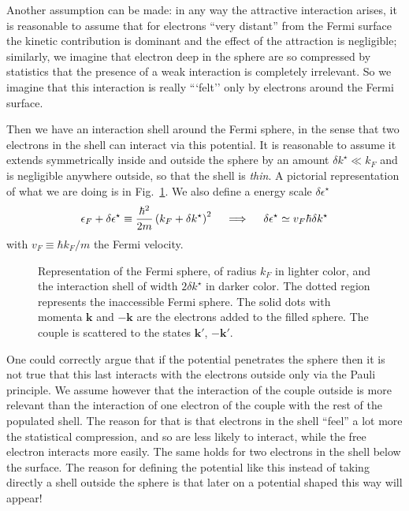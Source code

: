 Another assumption can be made: in any way the attractive interaction arises, it is reasonable to assume that for electrons ``very distant'' from the Fermi surface the kinetic contribution is dominant and the effect of the attraction is negligible; similarly, we imagine that electron deep in the sphere are so compressed by statistics that the presence of a weak interaction is completely irrelevant. So we imagine that this interaction is really ```felt'' only by electrons around the Fermi surface.

Then we have an interaction shell around the Fermi sphere, in the sense that two electrons in the shell can interact via this potential. It is reasonable to assume it extends symmetrically inside and outside the sphere by an amount $\delta k^\star \ll k_F$ and is negligible anywhere outside, so that the shell is \textit{thin}. A pictorial representation of what we are doing is in Fig.~\ref{fig:fermi sphere and shell}. We also define a energy scale $\delta\epsilon^\star$
\[
	\epsilon_F + \delta\epsilon^\star \equiv \frac{\hbar^2}{2m} \left({k_F + \delta k^\star}\right)^2
	\quad\implies\quad
	\delta\epsilon^\star \simeq v_F \hbar \delta k^\star
\]
with $v_F \equiv \hbar k_F/m$ the Fermi velocity.

\begin{figure}
	\centering
	
	\caption{Representation of the Fermi sphere, of radius $k_F$ in lighter color, and the interaction shell of width $2\delta k^\star$ in darker color. The dotted region represents the inaccessible Fermi sphere. The solid dots with momenta $\mathbf{k}$ and $-\mathbf{k}$ are the electrons added to the filled sphere. The couple is scattered to the states $\mathbf{k}'$, $-\mathbf{k}'$.}
	\label{fig:fermi sphere and shell}
\end{figure}

One could correctly argue that if the potential penetrates the sphere then it is not true that this last interacts with the electrons outside only via the Pauli principle. We assume however that the interaction of the couple outside is more relevant than the interaction of one electron of the couple with the rest of the populated shell. The reason for that is that electrons in the shell ``feel'' a lot more the statistical compression, and so are less likely to interact, while the free electron interacts more easily. The same holds for two electrons in the shell below the surface. The reason for defining the potential like this instead of taking directly a shell outside the sphere is that later on a potential shaped this way will appear!

